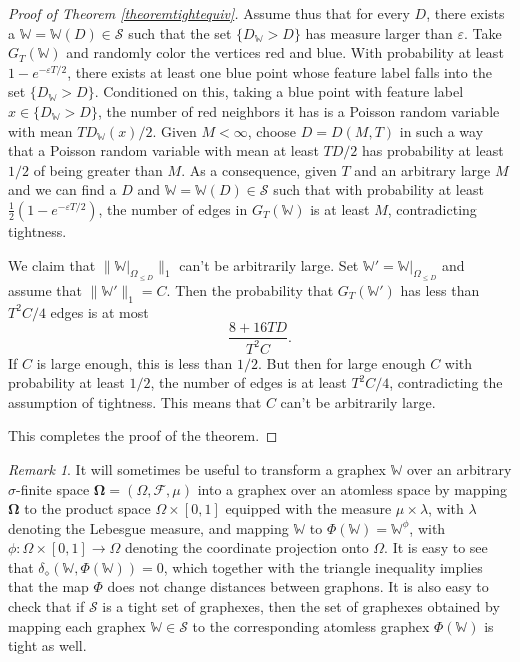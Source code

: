 \documentclass{amsart}
\numberwithin{equation}{section}
\numberwithin{figure}{section}
\theoremstyle{definition}
\theoremstyle{remark}
\newtheorem{remark}[theorem]{Remark}
\newcommand{\eps}{\varepsilon}
\newcommand{\bOmega}{{\mathbf{\Omega}}}
\newcommand{\cW}{\mathbb{W}}
\newcommand{\cS}{\mathcal{S}}
\newcommand{\cF}{\mathcal{F}}
\def\delGP{\delta_\diamond}
\begin{document}
\begin{proof}[Proof of Theorem \ref{theoremtightequiv}]
Assume thus that for every $D$, there exists a $\cW=\cW(D)\in \cS$ such that
the set $\{D_\cW> D\}$ has measure larger than $\eps$. Take $G_T(\cW)$ and
randomly color the vertices red and blue. With probability at least
$1-e^{-\varepsilon T/2}$, there exists at least one blue point whose feature
label falls into the set $\{D_\cW > D\}$. Conditioned on this, taking a blue
point with feature label $x\in \{D_\cW > D\}$, the number of red neighbors it
has is a Poisson random variable with mean $TD_\cW(x)/2$. Given $M<\infty$,
choose $D=D(M,T)$ in such a way that a Poisson random variable with mean at
least $TD/2$ has probability at least $1/2$ of being greater than $M$. As a
consequence, given $T$ and an arbitrary large $M$ and we can find a $D$ and
$\cW=\cW(D)\in \cS$ such that with probability at least $\frac 12
(1-e^{-\varepsilon T/2})$, the number of edges in $G_T(\cW)$ is at least $M$,
contradicting tightness.

We claim that $\|\cW|_{\Omega_{\leq D}}\|_1$ can't be arbitrarily large. Set
$\cW'=\cW|_{\Omega_{\leq D}}$ and assume that $\|\cW'\|_1=C$. Then the
probability that $G_T(\cW')$ has less than $T^2C/4$ edges is at most
\[\frac{8+16TD}{T^2C}
.\] If $C$ is large enough, this is less than $1/2$. But then for large
enough $C$ with probability at least $1/2$, the number of edges is at least
$T^2C/4$, contradicting the assumption of tightness. This means that $C$
can't be arbitrarily large.

This completes the proof of the theorem.
\end{proof}

\begin{remark}\label{rem:DC-mon}
It will sometimes be useful to transform a graphex $\cW$ over an arbitrary
$\sigma$-finite space $\bOmega=(\Omega,\cF,\mu)$ into a graphex over an
atomless space by mapping $\bOmega$ to the product space $\Omega\times [0,1]$
equipped with the measure $\mu\times\lambda$, with $\lambda$ denoting the
Lebesgue measure, and mapping $\cW$ to $\Phi(\cW)=\cW^\phi$, with
$\phi\colon\Omega\times[0,1]\to\Omega$ denoting the coordinate projection
onto $\Omega$. It is easy to see that $\delGP(\cW,\Phi(\cW))=0$, which
together with the triangle inequality implies that the map $\Phi$ does not
change distances between graphons. It is also easy to check that if $\cS$ is
a tight set of graphexes, then the set of graphexes obtained by mapping each
graphex $\cW\in\cS$ to the corresponding atomless graphex $\Phi(\cW)$ is
tight as well.
\end{remark}
\end{document}
